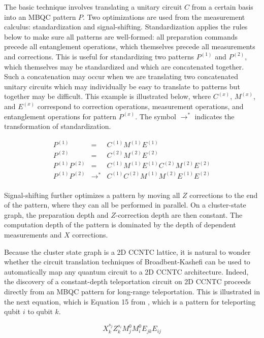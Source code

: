 The basic
technique involves translating a unitary circuit $C$ from a certain basis
into an MBQC pattern $P$. Two optimizations are used from the measurement
calculus: standardization and signal-shifting. Standardization applies
the rules below to make sure all patterns are well-formed: all
preparation commands precede all entanglement operations, which themselves
precede all measurements and corrections. This is useful for
standardizing two patterns $P^(1)$ and $P^(2)$, which themselves may be
standardized and which are concatenated together. Such a concatenation
may occur when we are translating two concatenated unitary circuits
which may individually be easy to translate to patterns but together may
be difficult. This example is illustrated below, where $C^{(x)}$,
$M^{(x)}$, and $E^{(x)}$ correspond to correction operations, measurement
operations, and entanglement operations for pattern $P^{(x)}$.
The symbol $\rightarrow^{*}$ indicates the transformation of standardization.

\begin{eqnarray}
P^{(1)} & = & C^{(1)}M^{(1)}E^{(1)} \\
P^{(2)} & = & C^{(2)}M^{(2)}E^{(2)} \\
P^{(1)}P^{(2)} & = & C^{(1)}M^{(1)}E^{(1)}C^{(2)}M^{(2)}E^{(2)} \\
P^{(1)}P^{(2)} & \rightarrow^{*} & C^{(1)}C^{(2)}M^{(1)}M^{(2)}E^{(1)}E^{(2)} \\
\end{eqnarray}

Signal-shifting further optimizes a pattern by moving all $Z$ corrections to
the end of the pattern, where they can all be performed in parallel. On a
cluster-state graph, the preparation depth and $Z$-correction depth are then
constant. The computation depth of the pattern is dominated by the
depth of dependent measurements and $X$ corrections.

Because the cluster state graph is a \textsf{2D CCNTC} lattice, it is natural to
wonder whether the circuit translation techniques of Broadbent-Kashefi
can be used to automatically map any quantum circuit to a \textsf{2D CCNTC}
architecture. Indeed, the discovery of a constant-depth teleportation
circuit on \textsf{2D CCNTC} proceeds directly from an MBQC pattern
for long-range teleportation. This is illustrated in the next equation,
which is Equation 15 from \cite{Broadbent2007},
which is a pattern for teleporting qubit $i$ to qubit $k$.

\begin{equation}
X^{s_j}_k Z^{s_i}_k M^0_j M^0_i E_{jk} E_{ij}
\end{equation}


